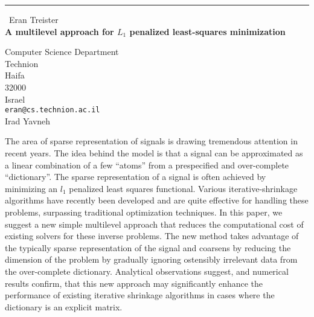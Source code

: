 \documentclass{report}
\begin{document}
\begin{center}
\rule{6in}{1pt} \
{\large Eran Treister \\
{\bf A multilevel approach for $\textit{L}_1$ penalized least-squares minimization}}

Computer Science Department \\ Technion \\ Haifa \\ 32000 \\ Israel
\\
{\tt eran@cs.technion.ac.il}\\
Irad Yavneh\end{center}

The area of sparse representation of signals is drawing tremendous
attention in recent years. The idea behind the model is that a
signal can be approximated as a linear combination of a few
``atoms'' from a prespecified and over-complete ``dictionary''.
The sparse representation of a signal is often achieved by
minimizing an $l_1$ penalized least squares functional. Various
iterative-shrinkage algorithms have recently been developed and
are quite effective for handling these problems, surpassing
traditional optimization techniques. In this paper, we suggest a
new simple multilevel approach that reduces the computational cost
of existing solvers for these inverse problems. The new method
takes advantage of the typically sparse representation of the
signal and coarsens by reducing the dimension of the problem by
gradually ignoring ostensibly irrelevant data from the
over-complete dictionary. Analytical observations suggest, and
numerical results confirm, that this new approach may
significantly enhance the performance of existing iterative
shrinkage algorithms in cases where the dictionary is an explicit
matrix.
\end{document}
